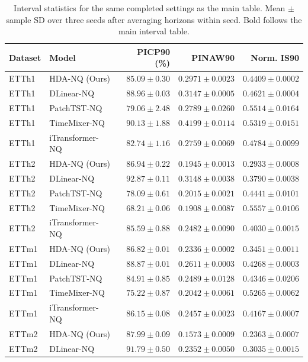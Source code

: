 \begin{table}[t]
\centering\small
\caption{Interval statistics for the same completed settings as the main table. Mean $\pm$ sample SD over three seeds after averaging horizons within seed. Bold follows the main interval table.}
\label{tab:full-intervals}
\begin{tabular*}{\textwidth}{@{\extracolsep{\fill}}llrrr@{}}
\toprule
Dataset & Model & PICP90 (\%) & PINAW90 & Norm. IS90 \\
\midrule
ETTh1 & HDA-NQ (Ours) & $85.09\pm0.30$ & $0.2971\pm0.0023$ & $\boldsymbol{0.4409\pm0.0002}$ \\
ETTh1 & DLinear-NQ & $88.96\pm0.03$ & $0.3147\pm0.0005$ & $0.4621\pm0.0004$ \\
ETTh1 & PatchTST-NQ & $79.06\pm2.48$ & $0.2789\pm0.0260$ & $0.5514\pm0.0164$ \\
ETTh1 & TimeMixer-NQ & $\boldsymbol{90.13\pm1.88}$ & $0.4199\pm0.0114$ & $0.5319\pm0.0151$ \\
ETTh1 & iTransformer-NQ & $82.74\pm1.16$ & $0.2759\pm0.0069$ & $0.4784\pm0.0099$ \\
ETTh2 & HDA-NQ (Ours) & $86.94\pm0.22$ & $0.1945\pm0.0013$ & $\boldsymbol{0.2933\pm0.0008}$ \\
ETTh2 & DLinear-NQ & $\boldsymbol{92.87\pm0.11}$ & $0.3148\pm0.0038$ & $0.3790\pm0.0038$ \\
ETTh2 & PatchTST-NQ & $78.09\pm0.61$ & $0.2015\pm0.0021$ & $0.4441\pm0.0101$ \\
ETTh2 & TimeMixer-NQ & $68.21\pm0.06$ & $0.1908\pm0.0087$ & $0.5557\pm0.0106$ \\
ETTh2 & iTransformer-NQ & $85.59\pm0.88$ & $0.2482\pm0.0090$ & $0.4030\pm0.0015$ \\
ETTm1 & HDA-NQ (Ours) & $86.82\pm0.01$ & $0.2336\pm0.0002$ & $\boldsymbol{0.3451\pm0.0011}$ \\
ETTm1 & DLinear-NQ & $\boldsymbol{88.87\pm0.01}$ & $0.2611\pm0.0003$ & $0.4268\pm0.0003$ \\
ETTm1 & PatchTST-NQ & $84.91\pm0.85$ & $0.2489\pm0.0128$ & $0.4346\pm0.0206$ \\
ETTm1 & TimeMixer-NQ & $75.22\pm0.87$ & $0.2042\pm0.0061$ & $0.5265\pm0.0062$ \\
ETTm1 & iTransformer-NQ & $86.15\pm0.08$ & $0.2457\pm0.0023$ & $0.4167\pm0.0007$ \\
ETTm2 & HDA-NQ (Ours) & $87.99\pm0.09$ & $0.1573\pm0.0009$ & $\boldsymbol{0.2363\pm0.0007}$ \\
ETTm2 & DLinear-NQ & $91.79\pm0.50$ & $0.2352\pm0.0050$ & $0.3035\pm0.0015$ \\

\end{tabular*}
\end{table}
